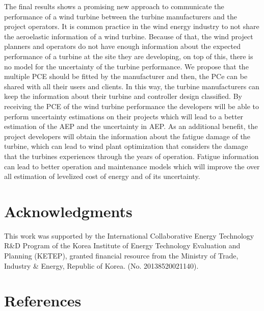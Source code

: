 \documentclass[preprint,12pt]{elsarticle}
\begin{document}
The final results shows a promising new approach to communicate the performance of a wind turbine between the turbine manufacturers and the project operators. It is common practice in the wind energy industry to not share the aeroelastic information of a wind turbine. Because of that, the wind project planners and operators do not have enough information about the expected performance of a turbine at the site they are developing, on top of this, there is no model for the uncertainty of the turbine performance. We propose that the multiple PCE should be fitted by the manufacturer and then, the PCe can be shared with all their users and clients. In this way, the turbine manufacturers can keep the information about their turbine and controller design classified. By receiving the PCE of the wind turbine performance the developers will be able to perform uncertainty estimations on their projects which will lead to a better estimation of the AEP and the uncertainty in AEP. As an additional benefit, the project developers will obtain the information about the fatigue damage of the turbine, which can lead to wind plant optimization that considers the damage that the turbines experiences through the years of operation. Fatigue information can lead to better operation and maintenance models which will improve the over all estimation of levelized cost of energy and of its uncertainty.

\section{Acknowledgments}

This work was supported by the International Collaborative Energy Technology R\&D Program of the Korea Institute of Energy Technology Evaluation and Planning (KETEP), granted financial resource from the Ministry of Trade, Industry \& Energy, Republic of Korea. (No. 20138520021140).




\section*{References}
\tiny


\end{document}
